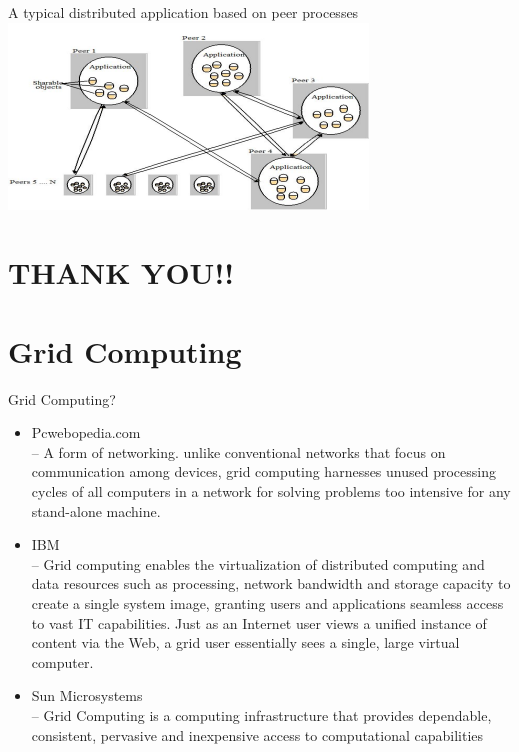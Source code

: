 \documentclass{SKP-beamer}
\begin{document}
\begin{frame}{A typical distributed application based on peer processes}
	\includegraphics[scale=1.4]{4.png}
\end{frame}



\section{\textbf{THANK YOU!!}}





\section{\textbf{Grid Computing}}

\begin{frame}{Grid Computing?}
	\begin{itemize}
		\item Pcwebopedia.com \\
		 – A form of networking. unlike conventional networks that focus on communication 
		among devices, grid computing harnesses unused processing cycles of all computers in 
		a network for solving problems too intensive for any stand-alone machine.
		
		\item IBM \\
		– Grid computing enables the virtualization of distributed computing and data resources 
		such as processing, network bandwidth and storage capacity to create a single system 
		image, granting users and applications seamless access to vast IT capabilities. Just as 
		an Internet user views a unified instance of content via the Web, a grid user essentially 
		sees a single, large virtual computer.
		
		
		\item Sun Microsystems \\
		
		– Grid Computing is a computing infrastructure that provides dependable, 
		consistent, pervasive and inexpensive access to computational capabilities
		
		
		
	\end{itemize}
\end{frame}
\end{document}
